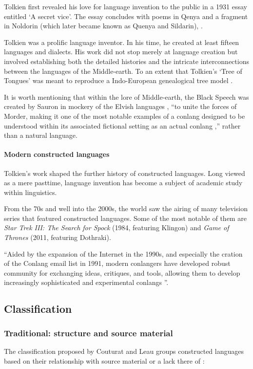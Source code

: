 \documentclass[14pt, a4paper]{extreport}
\begin{document}
Tolkien first revealed his love for language invention to the public in a 1931 essay entitled `A secret vice'. The essay concludes with poems in Qenya and a fragment in Noldorin (which later became known as Quenya and Sildarin), \parencite{tolkien83}.

Tolkien was a prolific language inventor. In his time, he created at least fifteen languages and dialects. His work did not stop merely at language creation but involved establishing both the detailed histories and the intricate interconnections between the languages of the Middle-earth. To an extent that Tolkien's `Tree of Tongues' was meant to reproduce a Indo-European genealogical tree model \parencite[101]{fimi}.

It is worth mentioning that within the lore of Middle-earth, the Black Speech was created by Sauron in mockery of the Elvish languages \parencite[20]{tolkien19}, ``to unite the forces of Morder, making it one of the most notable examples of a conlang designed to be understood within its associated fictional setting as an actual conlang \parencite{sanders},'' rather than a natural language.
        \paragraph{Modern constructed languages}
Tolkien's work shaped the further history of constructed languages. Long viewed as a mere pasttime, language invention has become a subject of academic study within linguistics.

From the 70s and well into the 2000s, the world saw the airing of many television series that featured constructed languages. Some of the most notable of them are \textit{Star Trek III: The Search for Spock} (1984, featuring Klingon) and \textit{Game of Thrones} (2011, featuring Dothraki).

``Aided by the expansion of the Internet in the 1990s, and especially the cration of the Conlang email list in 1991, modern conlangers have developed robust community for exchanging ideas, critiques, and tools, allowing them to develop increasingly sophisticated and experimental conlangs \parencite{sanders}''.
    \subsection{Classification}
      \subsubsection{Traditional: structure and source material}
The classification proposed by Couturat and Leau groups constructed languages based on their relationship with source material or a lack there of \parencite{couturat}:
\end{document}
